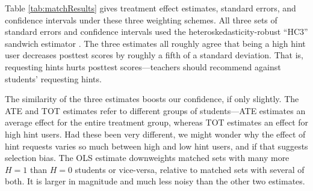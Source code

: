 \documentclass{article}\usepackage[]{graphicx}\usepackage[]{color}
\begin{document}


Table \ref{tab:matchResults} gives treatment effect estimates,
standard errors, and confidence intervals under these three weighting
schemes.
All three sets of standard errors
and confidence intervals used the heteroskedasticity-robust ``HC3'' sandwich estimator
\citep{sandwichPackage}.
The three estimates all roughly agree that being a high hint user
decreases posttest scores by roughly a fifth of a standard deviation.
That is, requesting hints hurts posttest scores---teachers should
recommend against students' requesting hints.

The similarity of the three estimates boosts our confidence, if only
slightly. The ATE and TOT estimates refer to different groups
of students---ATE estimates an average effect for the entire treatment
group, whereas TOT estimates an effect for high hint users. Had these
been very different, we might wonder why the effect of hint requests
varies so much between high and low hint users, and if that suggests
selection bias.
The OLS estimate downweights matched sets with many more $H=1$ than
$H=0$ students or vice-versa, relative to matched sets with several of
both.
It is larger in magnitude and much less noisy than the other two
estimates.
\end{document}
